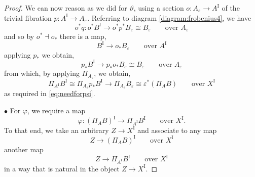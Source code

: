 \documentclass[11pt]{article}
\newcommand{\ra}{\ensuremath{\rightarrow}}
\newcommand{\I}{\ensuremath{\mathrm{I}}}
\theoremstyle{remark}
\theoremstyle{definition}
\begin{document}
\begin{proof}
We can now reason as we did for $\vartheta$, using a section $o :  A_\varepsilon \ra A^\I$ of the trivial fibration $p : A^\I \ra A_\varepsilon$. Referring to diagram \eqref{diagram:frobenius4}, we have
\[
o^*q : o^*B^\I \to o^*p^* B_\varepsilon \cong B_\varepsilon  \qquad \text{over $A_\varepsilon$}
\]
and so by $o^*\dashv o_*$ there is a map, 
\[
B^\I \to o_*B_\varepsilon  \qquad \text{over $A^\I$}
\]
applying $p_*$ we obtain,
\[
p_*B^\I \to p_*o_*B_\varepsilon \cong B_\varepsilon  \qquad \text{over $A_\varepsilon$}
\]
from which, by applying $\Pi_{A_\varepsilon}$, we obtain,
\[
\Pi_{A^\I}B^\I \cong \Pi_{A_\varepsilon} p_*B^\I \to \Pi_{A_\varepsilon}B_\varepsilon  \cong \varepsilon^*(\Pi_{A}B)   \qquad \text{over $X^\I$}
\]
as required in \eqref{eq:needforpsi}.

\medskip
\noindent $\bullet$ For $\varphi$, we require a map 
\[
\varphi : (\Pi_AB)^\I \to \Pi_{A^\I}B^\I \qquad \text{over $X^\I$.}
\]
To that end, we take an arbitrary $Z \ra X^\I$ and associate to any map 
\[
Z \to (\Pi_AB)^\I \qquad \text{over $X^\I$}
\]
another map 
\[
Z \to \Pi_{A^\I}B^\I \qquad \text{over $X^\I$}
\]
in a way that is natural in the object $Z \ra X^\I$.  


\end{proof}
\end{document}
